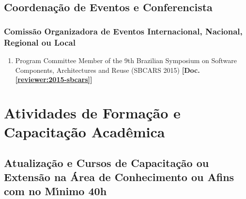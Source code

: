 \documentclass[a4paper,oneside,10pt]{article}
\begin{document}
\subsection{Coordenação de Eventos e Conferencista}
\vspace{0.3cm}


\subsubsection{Comiss\~{a}o Organizadora de Eventos Internacional, Nacional, Regional ou Local}
\vspace{0.3cm}

\begin{enumerate}
\renewcommand{\labelenumi}{{\large\bfseries\arabic{enumi}.}}

    \item Program Committee Member of the 9th Brazilian Symposium on Software Components, Architectures and Reuse (SBCARS 2015) \textbf{[Doc. \ref{reviewer:2015-sbcars}]}

\end{enumerate}

\newpage
\section{Atividades de Forma\c{c}\~{a}o e Capacita\c{c}\~{a}o Acad\^{e}mica}
\vspace{0.3cm}


\subsection{Atualiza\c{c}\~{a}o e Cursos de Capacita\c{c}\~{a}o ou Extens\~{a}o na \'{A}rea de Conhecimento ou Afins com no M\'{\i}nimo 40h}
\vspace{0.3cm}
\end{document}
